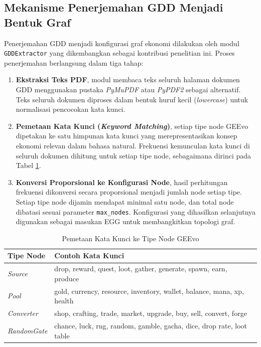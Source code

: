 \subsection{Mekanisme Penerjemahan GDD Menjadi Bentuk Graf}

Penerjemahan GDD menjadi konfigurasi graf ekonomi dilakukan oleh modul \texttt{GDDExtractor} yang dikembangkan sebagai kontribusi penelitian ini. Proses penerjemahan berlangsung dalam tiga tahap:

\begin{enumerate}
    \item \textbf{Ekstraksi Teks PDF}, modul membaca teks seluruh halaman dokumen GDD menggunakan pustaka \textit{PyMuPDF} atau \textit{PyPDF2} sebagai alternatif. Teks seluruh dokumen diproses dalam bentuk huruf kecil (\textit{lowercase}) untuk normalisasi pencocokan kata kunci.

    \item \textbf{Pemetaan Kata Kunci (\textit{Keyword Matching})}, setiap tipe node GEEvo dipetakan ke satu himpunan kata kunci yang merepresentasikan konsep ekonomi relevan dalam bahasa natural. Frekuensi kemunculan kata kunci di seluruh dokumen dihitung untuk setiap tipe node, sebagaimana dirinci pada Tabel \ref{tab:keyword_map}.

    \item \textbf{Konversi Proporsional ke Konfigurasi Node}, hasil perhitungan frekuensi dikonversi secara proporsional menjadi jumlah node setiap tipe. Setiap tipe node dijamin mendapat minimal satu node, dan total node dibatasi sesuai parameter \texttt{max\_nodes}. Konfigurasi yang dihasilkan selanjutnya digunakan sebagai masukan EGG untuk membangkitkan topologi graf.
\end{enumerate}

\begin{table}[htbp]
\centering
\caption{Pemetaan Kata Kunci ke Tipe Node GEEvo}
\label{tab:keyword_map}
\begin{tabular}{ll}
\hline
\textbf{Tipe Node} & \textbf{Contoh Kata Kunci} \\
\hline
\textit{Source}     & drop, reward, quest, loot, gather, generate, spawn, earn, produce \\
\textit{Pool}       & gold, currency, resource, inventory, wallet, balance, mana, xp, health \\
\textit{Converter}  & shop, crafting, trade, market, upgrade, buy, sell, convert, forge \\
\textit{RandomGate} & chance, luck, rng, random, gamble, gacha, dice, drop rate, loot table \\
\hline
\end{tabular}
\end{table}

